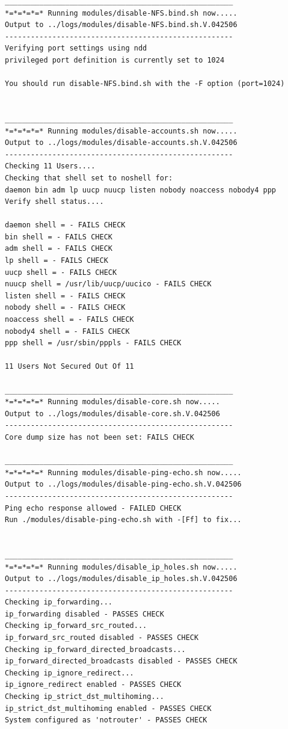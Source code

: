 \begin{verbatim}
_____________________________________________________
*=*=*=*=* Running modules/disable-NFS.bind.sh now.....
Output to ../logs/modules/disable-NFS.bind.sh.V.042506
-----------------------------------------------------
Verifying port settings using ndd
privileged port definition is currently set to 1024

You should run disable-NFS.bind.sh with the -F option (port=1024)


_____________________________________________________
*=*=*=*=* Running modules/disable-accounts.sh now.....
Output to ../logs/modules/disable-accounts.sh.V.042506
-----------------------------------------------------
Checking 11 Users....
Checking that shell set to noshell for:
daemon bin adm lp uucp nuucp listen nobody noaccess nobody4 ppp
Verify shell status....

daemon shell = - FAILS CHECK
bin shell = - FAILS CHECK
adm shell = - FAILS CHECK
lp shell = - FAILS CHECK
uucp shell = - FAILS CHECK
nuucp shell = /usr/lib/uucp/uucico - FAILS CHECK
listen shell = - FAILS CHECK
nobody shell = - FAILS CHECK
noaccess shell = - FAILS CHECK
nobody4 shell = - FAILS CHECK
ppp shell = /usr/sbin/pppls - FAILS CHECK

11 Users Not Secured Out Of 11

_____________________________________________________
*=*=*=*=* Running modules/disable-core.sh now.....
Output to ../logs/modules/disable-core.sh.V.042506
-----------------------------------------------------
Core dump size has not been set: FAILS CHECK

_____________________________________________________
*=*=*=*=* Running modules/disable-ping-echo.sh now.....
Output to ../logs/modules/disable-ping-echo.sh.V.042506
-----------------------------------------------------
Ping echo response allowed - FAILED CHECK
Run ./modules/disable-ping-echo.sh with -[Ff] to fix...


_____________________________________________________
*=*=*=*=* Running modules/disable_ip_holes.sh now.....
Output to ../logs/modules/disable_ip_holes.sh.V.042506
-----------------------------------------------------
Checking ip_forwarding...
ip_forwarding disabled - PASSES CHECK
Checking ip_forward_src_routed...
ip_forward_src_routed disabled - PASSES CHECK
Checking ip_forward_directed_broadcasts...
ip_forward_directed_broadcasts disabled - PASSES CHECK
Checking ip_ignore_redirect...
ip_ignore_redirect enabled - PASSES CHECK
Checking ip_strict_dst_multihoming...
ip_strict_dst_multihoming enabled - PASSES CHECK
System configured as 'notrouter' - PASSES CHECK


\end{verbatim}
